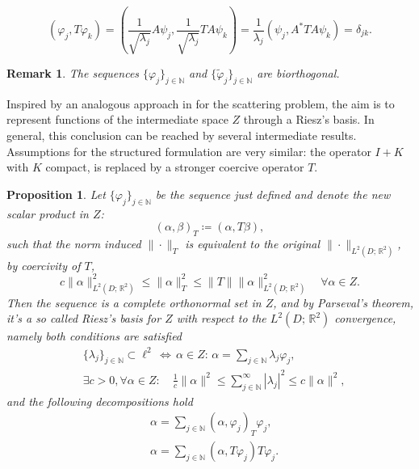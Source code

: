 \documentclass[10pt, a4paper, twoside, openright]{book}
\theoremstyle{definition}
\theoremstyle{plain}
\theoremstyle{plain}
\theoremstyle{plain}
\newtheorem{proposition}[subsection]{Proposition}
\theoremstyle{plain}
\newtheorem{remark}[subsection]{Remark}
\theoremstyle{plain}
\theoremstyle{plain}
\theoremstyle{plain}
\theoremstyle{plain}
\let\phi\varphi
\begin{document}
\begin{equation}
 (\phi_j, T\phi_k) =  ( \frac{1}{\sqrt{\lambda_j}} A\psi_j, \frac{1}{\sqrt{\lambda_j}} TA\psi_k) = \frac{1}{\lambda_j}( \psi_j, A^*TA\psi_k) = \delta_{jk}.
\end{equation}
\begin{remark}
 The sequences $\{\phi_j\}_{j\in\mathbb{N}}$ and $\{\tilde{\phi}_j\}_{j\in\mathbb{N}}$ are biorthogonal.
\end{remark}
Inspired by an analogous approach in \cite{kirsch:shape-1998} for the scattering problem, the aim is to represent functions of the intermediate space $Z$ through a Riesz's basis.
In general, this conclusion can be reached by several intermediate results. Assumptions for the structured formulation are very similar: the operator $I+K$ with $K$ compact, is replaced by a stronger coercive operator $T$.
\begin{proposition}
 Let $\{\phi_j\}_{j\in\mathbb{N}}$ be the sequence just defined and denote the new scalar product in $Z$:
 \begin{equation}
   ( \alpha, \beta )_T \coloneqq ( \alpha , T\beta),
 \end{equation}
 such that the norm induced $\|\cdot\|_T$ is equivalent to the original $\|\cdot\|_{L^2(D;\,\mathbb{R}^2)}$, by coercivity of $T$,
  \begin{equation}
   c\|\alpha\|_{L^2(D;\,\mathbb{R}^2)}^2\leq \|\alpha\|_T^2 \leq \|T\|\|\alpha\|_{L^2(D;\,\mathbb{R}^2)}^2\quad \forall \alpha\in Z.
  \end{equation}
 Then the sequence is a complete orthonormal set in $Z$, and by Parseval's theorem, it's a so called Riesz's basis for $Z$ with respect to the $L^2(D;\,\mathbb{R}^2)$ convergence, namely both conditions are satisfied
 \begin{align}
 &\{\lambda_j\}_{j \in \mathbb{N}} \subset \ell^2 \,\Leftrightarrow \,\alpha \in Z:\,\alpha = \sum_{j \in \mathbb{N}}\lambda_j \phi_j, \\
 & \exists c>0, \forall \alpha \in Z: \quad \frac{1}{c}\|\alpha\|^2 \leq \sum_{j\in\mathbb{N}}^\infty|\lambda_j|^2  \leq c \|\alpha\|^2,
 \end{align}
 and the following decompositions hold
 \begin{align}
  & \alpha = \sum_{j \in \mathbb{N}}(\alpha,\phi_j)_T \phi_j,\\
  & \alpha = \sum_{j \in \mathbb{N}}(\alpha,T\phi_j) T\phi_j. 
 \end{align}
\end{proposition}
\end{document}

